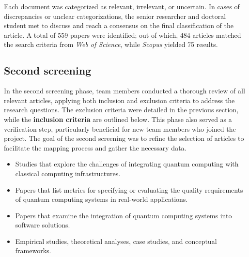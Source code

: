 Each document was categorized as relevant, irrelevant, or uncertain. In cases of discrepancies or unclear categorizations, the senior researcher and doctoral student met to discuss and reach a consensus on the final classification of the article. A total of 559 papers were identified; out of which, 484 articles matched the search criteria from \textit{Web of Science}, while \textit{Scopus} yielded 75 results.


\subsection{Second screening}

In the second screening phase, team members conducted a thorough review of all relevant articles, applying both inclusion and exclusion criteria to address the research questions. The exclusion criteria were detailed in the previous section, while the \textbf{inclusion criteria} are outlined below. This phase also served as a verification step, particularly beneficial for new team members who joined the project. The goal of the second screening was to refine the selection of articles to facilitate the mapping process and gather the necessary data.

\begin{itemize}
  \item Studies that explore the challenges of integrating quantum computing with classical computing infrastructures.
  \item Papers that list metrics for specifying or evaluating the quality requirements of quantum computing systems in real-world applications.
  \item Papers that examine the integration of quantum computing systems into software solutions.
  \item Empirical studies, theoretical analyses, case studies, and conceptual frameworks.
\end{itemize}

